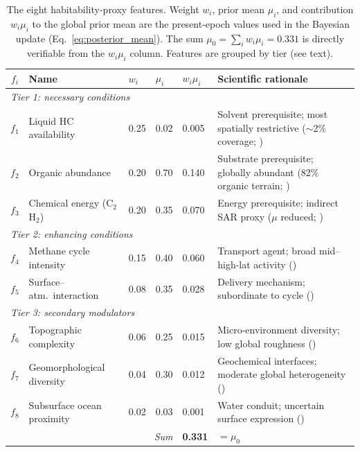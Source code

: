 \begin{table}[H]
\centering
\small
\begin{tabular}{clp{0.45cm}p{0.55cm}p{0.6cm}p{5.2cm}}
\toprule
\textbf{$f_i$} & \textbf{Name} & $w_i$ & $\mu_i$ & $w_i\mu_i$ & \textbf{Scientific rationale} \\
\midrule
\multicolumn{6}{l}{\textit{Tier 1: necessary conditions}} \\[2pt]
$f_1$ & Liquid HC availability  & 0.25 & 0.02  & 0.005 & Solvent prerequisite; most spatially restrictive ($\sim$2\% coverage; \citealt{Hayes2008}) \\
$f_2$ & Organic abundance       & 0.20 & 0.70  & 0.140 & Substrate prerequisite; globally abundant (82\% organic terrain; \citealt{Malaska2025}) \\
$f_3$ & Chemical energy (C$_2$H$_2$) & 0.20 & 0.35 & 0.070 & Energy prerequisite; indirect SAR proxy ($\mu$ reduced; \citealt{McKaySmith2005,Yanez2024}) \\[4pt]
\midrule
\multicolumn{6}{l}{\textit{Tier 2: enhancing conditions}} \\[2pt]
$f_4$ & Methane cycle intensity & 0.15 & 0.40  & 0.060 & Transport agent; broad mid--high-lat activity (\citealt{MitchellLora2016,Turtle2011}) \\
$f_5$ & Surface--atm.\ interaction & 0.08 & 0.35 & 0.028 & Delivery mechanism; subordinate to cycle (\citealt{Hayes2016,Miller2021channels}) \\[4pt]
\midrule
\multicolumn{6}{l}{\textit{Tier 3: secondary modulators}} \\[2pt]
$f_6$ & Topographic complexity  & 0.06 & 0.25  & 0.015 & Micro-environment diversity; low global roughness (\citealt{Corlies2017Titan,Lopes2019}) \\
$f_7$ & Geomorphological diversity & 0.04 & 0.30 & 0.012 & Geochemical interfaces; moderate global heterogeneity (\citealt{Shock2007,Lopes2019}) \\
$f_8$ & Subsurface ocean proximity & 0.02 & 0.03 & 0.001 & Water conduit; uncertain surface expression (\citealt{Iess2012,Hemingway2013}) \\
\midrule
\multicolumn{4}{r}{\textit{Sum}} & \textbf{0.331} & $= \mu_0$ \\
\bottomrule
\end{tabular}
\caption{The eight habitability-proxy features.  Weight $w_i$, prior mean $\mu_i$,
  and contribution $w_i\mu_i$ to the global prior mean are the present-epoch values
  used in the Bayesian update (Eq.~\ref{eq:posterior_mean}).
  The sum $\mu_0 = \sum_i w_i\mu_i = 0.331$ is directly verifiable from the $w_i\mu_i$
  column.  Features are grouped by tier (see text).}
\label{tab:feature_summary}
\end{table}

